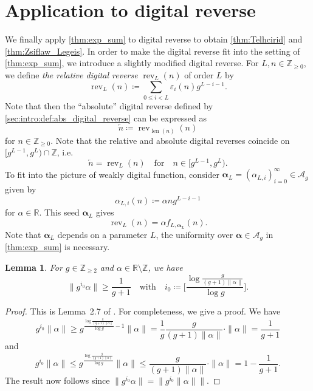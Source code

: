 \documentclass[hidelinks]{amsart}
\numberwithin{equation}{section}
\theoremstyle{plain}
\newtheorem{lemma}{Lemma}
\theoremstyle{definition}
\newcommand{\textdf}[1]{\textsl{#1}}
\let\tmp\phi
\let\phi\varphi
\let\varphi\tmp
\let\tmp\epsilon
\let\epsilon\varepsilon
\let\varepsilon\tmp
\DeclareMathOperator{\rev}{rev}
\newcommand{\arev}{\overleftarrow}
\DeclareMathOperator{\len}{len}
\begin{document}
\section{Application to digital reverse}
\label{sec:digital_reverse}
We finally apply \cref{thm:exp_sum} to digital reverse
to obtain \cref{thm:Telhcirid} and \cref{thm:Zsiflaw_Legeis}.
In order to make the digital reverse fit into the setting of \cref{thm:exp_sum},
we introduce a slightly modified digital reverse.
For $L,n\in\mathbb{Z}_{\ge0}$,
we define \textdf{the relative digital reverse} $\rev_{L}(n)$ of order $L$ by
\[
\rev_{L}(n)
\coloneqq
\sum_{0\le i<L}\epsilon_{i}(n)g^{L-i-1}.
\]
Note that then the ``absolute'' digital reverse defined by \cref{sec:intro:def:abs_digital_reverse}
can be expressed as
\[
\arev{n}
\coloneqq
\rev_{\len(n)}(n)
\]
for $n\in\mathbb{Z}_{\ge0}$.
Note that the relative and absolute digital reverses coincide
on $[g^{L-1},g^{L})\cap\mathbb{Z}$, i.e.\ 
\[
\arev{n}=\rev_{L}(n)
\quad\text{for}\quad
n\in[g^{L-1},g^{L}).
\]
To fit into the picture of weakly digital function,
consider $\bm{\alpha}_{L}=(\alpha_{L,i})_{i=0}^{\infty}\in\mathscr{A}_{g}$ given by
\[
\alpha_{L,i}(n)
\coloneqq
\alpha ng^{L-i-1}
\]
for $\alpha\in\mathbb{R}$. This seed $\bm{\alpha}_{L}$ gives
\[
\rev_{L}(n)
=
\alpha f_{L,\bm{\alpha}_{L}}(n).
\]
Note that $\bm{\alpha}_{L}$ depends on a parameter $L$,
the uniformity over $\bm{\alpha}\in\mathscr{A}_{g}$ in \cref{thm:exp_sum} is necessary.

\begin{lemma}
\label{lem:geometric_progression_mod1}
For $g\in\mathbb{Z}_{\ge2}$ and $\alpha\in\mathbb{R}\setminus\mathbb{Z}$, we have
\[
\|g^{i_{0}}\alpha\|\ge\frac{1}{g+1}
\quad\text{with}\quad
i_{0}
\coloneqq
\biggl[\frac{\log\frac{g}{(g+1)\|\alpha\|}}{\log g}\biggr].
\]
\end{lemma}
\begin{proof}
This is Lemma~2.7 of \cite{DMRSS:ReversiblePrime}.
For completeness, we give a proof. We have
\[
g^{i_{0}}\|\alpha\|
\ge
g^{\frac{\log\frac{g}{(g+1)\|\alpha\|}}{\log g}-1}\|\alpha\|
=
\frac{1}{g}\frac{g}{(g+1)\|\alpha\|}\cdot\|\alpha\|
=
\frac{1}{g+1}
\]
and
\[
g^{i_{0}}\|\alpha\|
\le
g^{\frac{\log\frac{g}{(g+1)\|\alpha\|}}{\log g}}\|\alpha\|
\le
\frac{g}{(g+1)\|\alpha\|}\cdot\|\alpha\|
=
1-\frac{1}{g+1}.
\]
The result now follows since $\|g^{i_{0}}\alpha\|=\|g^{i_{0}}\|\alpha\|\|$.
\end{proof}
\end{document}
